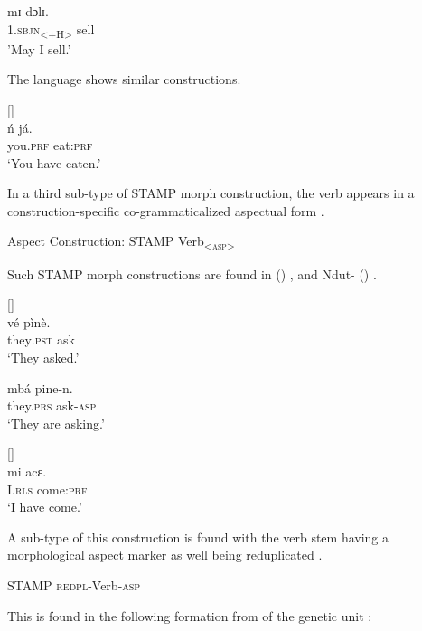 \documentclass[output=paper]{langsci/langscibook}
\begin{document}
\ex \label{ex:anderson:14b}
\gll mɪ    dɔlɪ.\\
  1.\textsc{sbjn}\textsubscript{<+H>}  sell\\
\glt 'May I sell.'
\z
\z

The  language  shows similar constructions.

\ea\label{ex:anderson:15}
   \citep[196]{Jungraithmayr1968}       []  \\
\gll \'{n}    já.    \\
you\textsc{.prf}  eat:\textsc{prf}    \\
\glt `You have eaten.'  
\z

\newpage 
In a third sub-type of STAMP morph construction, the verb appears in a construction-specific co-grammaticalized aspectual form . 

\ea\label{ex:anderson:16}
Aspect Construction:    STAMP  Verb\textsubscript{<\textsc{asp}>}    
\z

Such STAMP morph constructions are found in  () , and Ndut- () .

\ea\label{ex:anderson:17}
\ea\label{ex:anderson:17a}
 \citep[114]{Arnott1958}          []\\
\gll vé     pìnè.        \\
  they\textsc{.pst}   ask          \textsc{}\\
\glt `They asked.'          

\ex \label{ex:anderson:17b}
\gll mbá       pi\textsuperscript{{\textbar}}ne-n.  \\
  they.\textsc{prs}    ask-\textsc{asp}\\
\glt `They are asking.'      
\z
\z

\ea\label{ex:anderson:18}
 \citep[Ndut- 4]{Pichl1973}      []\\
\gll mi    acɛ.          \\
I.\textsc{rls}  come:\textsc{prf}\\
\glt `I have come.'  
\z

A sub-type of this construction is found with the verb stem having a morphological aspect marker as well being reduplicated . 

\ea\label{ex:anderson:19}
   STAMP  \textsc{redpl}-Verb-\textsc{asp} 
\z

This is found in the following formation from  of the  genetic unit :
\end{document}
